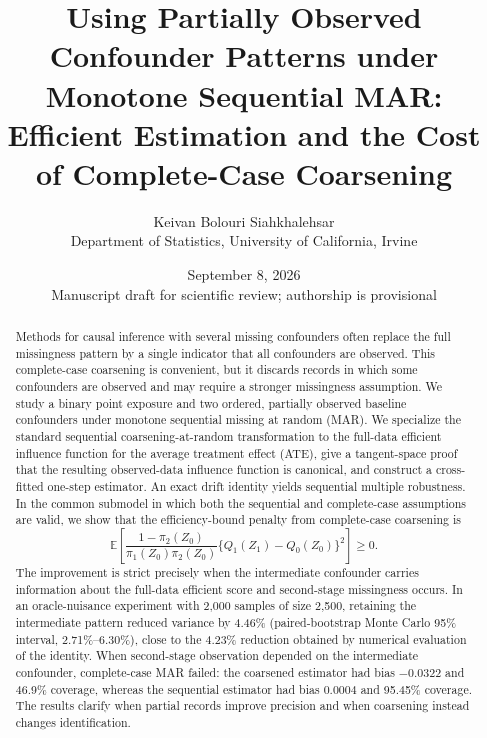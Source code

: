 \documentclass[11pt]{article}
\title{\vspace{-1.2cm}\textbf{Using Partially Observed Confounder Patterns under Monotone Sequential MAR: Efficient Estimation and the Cost of Complete-Case Coarsening}}
\author{Keivan Bolouri Siahkhalehsar\\
\small Department of Statistics, University of California, Irvine}
\date{September 8, 2026\ifinternal\\[4pt]\small Manuscript draft for scientific review; authorship is provisional\fi}
\newif\ifinternal
\theoremstyle{definition}
\newcommand{\E}{\mathbb{E}}
\newcommand{\1}{\mathbf{1}}
\begin{document}
\maketitle

\ifinternal
\begin{center}
\fcolorbox{navy}{lightblue}{\parbox{0.91\textwidth}{\small
\textbf{Review status.} This document is a research manuscript draft, not a submitted or peer-reviewed article. The theoretical results and software have been internally checked, and the reported primary simulation was independently rerun from the archived code. Independent statistical review and a substantive data application remain necessary before journal submission.}}
\end{center}
\fi

\begin{abstract}
Methods for causal inference with several missing confounders often replace the full missingness pattern by a single indicator that all confounders are observed. This complete-case coarsening is convenient, but it discards records in which some confounders are observed and may require a stronger missingness assumption. We study a binary point exposure and two ordered, partially observed baseline confounders under monotone sequential missing at random (MAR). We specialize the standard sequential coarsening-at-random transformation to the full-data efficient influence function for the average treatment effect (ATE), give a tangent-space proof that the resulting observed-data influence function is canonical, and construct a cross-fitted one-step estimator. An exact drift identity yields sequential multiple robustness. In the common submodel in which both the sequential and complete-case assumptions are valid, we show that the efficiency-bound penalty from complete-case coarsening is
\[
\E\!\left[\frac{1-\pi_2(Z_0)}{\pi_1(Z_0)\pi_2(Z_0)}
\{Q_1(Z_1)-Q_0(Z_0)\}^2\right]\ge 0.
\]
The improvement is strict precisely when the intermediate confounder carries information about the full-data efficient score and second-stage missingness occurs. In an oracle-nuisance experiment with 2,000 samples of size 2,500, retaining the intermediate pattern reduced variance by 4.46\% (paired-bootstrap Monte Carlo 95\% interval, 2.71\%--6.30\%), close to the 4.23\% reduction obtained by numerical evaluation of the identity. When second-stage observation depended on the intermediate confounder, complete-case MAR failed: the coarsened estimator had bias $-0.0322$ and 46.9\% coverage, whereas the sequential estimator had bias $0.0004$ and 95.45\% coverage. The results clarify when partial records improve precision and when coarsening instead changes identification.
\end{abstract}
\end{document}
